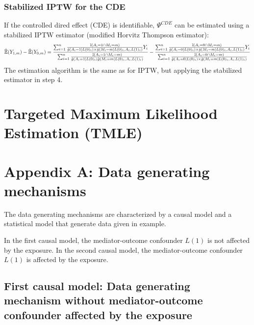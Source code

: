 \documentclass[
]{book}
\begin{document}
\hypertarget{stabilized-iptw-for-the-cde}{%
\subsection{Stabilized IPTW for the CDE}\label{stabilized-iptw-for-the-cde}}

If the controlled dired effect (CDE) is identifiable, \(\Psi^{CDE}\) can be estimated using a stabilized IPTW estimator (modified Horvitz Thompson estimator):
\begin{equation}
\small
\hat{\mathbb{E}}(Y_{1,m}) - \hat{\mathbb{E}}(Y_{0,m}) =  \frac{ \sum_{i=1}^n \frac{\mathbb{I}(A_i=1 \cap M_i=m)}{\hat{g}(A_i=1 \mid L(0)_i) \times \hat{g}(M_i=m \mid L(0)_i,A_i,L(1)_i)} Y_i}{\sum_{i=1}^n \frac{\mathbb{I}(A_i=1 \cap M_i=m)}{\hat{g}(A_i=1 \mid L(0)_i) \hat{g}(M_i=m \mid L(0)_i,A_i,L(1)_i)}} - \frac{ \sum_{i=1}^n \frac{\mathbb{I}(A_i=0 \cap M_i=m)}{\hat{g}(A_i=0 \mid L(0)_i) \times \hat{g}(M_i=m \mid L(0)_i,A_i,L(1)_i)} Y_i}{ \sum_{i=1}^n \frac{\mathbb{I}(A_i=0 \cap M_i=m)}{\hat{g}(A_i=0 \mid L(0)_i) \times \hat{g}(M_i=m \mid L(0)_i,A_i,L(1)_i)}}
\end{equation}
The estimation algorithm is the same as for IPTW, but applying the stabilized estimator in step 4.

\hypertarget{chap_tmle}{%
\chapter{Targeted Maximum Likelihood Estimation (TMLE)}\label{chap_tmle}}

\hypertarget{appendix_a}{%
\chapter{Appendix A: Data generating mechanisms}\label{appendix_a}}

The data generating mechanisms are characterized by a causal model and a statistical model that generate data given in example.

In the first causal model, the mediator-outcome confounder \(L(1)\) is not affected by the exposure. In the second causal model, the mediator-outcome confounder \(L(1)\) is affected by the exposure.

\hypertarget{first-causal-model-data-generating-mechanism-without-mediator-outcome-confounder-affected-by-the-exposure}{%
\section{First causal model: Data generating mechanism without mediator-outcome confounder affected by the exposure}\label{first-causal-model-data-generating-mechanism-without-mediator-outcome-confounder-affected-by-the-exposure}}
\end{document}
